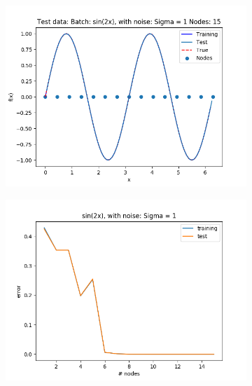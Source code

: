 \documentclass{article}
\begin{document}
\begin{figure}[ht!]
    \centering
    \begin{subfigure}[t]{0.4\textwidth}
        \centering
        \includegraphics[width=1\textwidth]{plots/batch/best_sin2x.png}
        \caption{}
    \end{subfigure}
    \begin{subfigure}[t]{0.4\textwidth}
        \centering
        \includegraphics[width=1\textwidth]{plots/batch/best_sin2x_error.png}
        \caption{}
    \end{subfigure}
    \begin{subfigure}[t]{0.4\textwidth}

\end{subfigure}
\end{figure}
\end{document}
